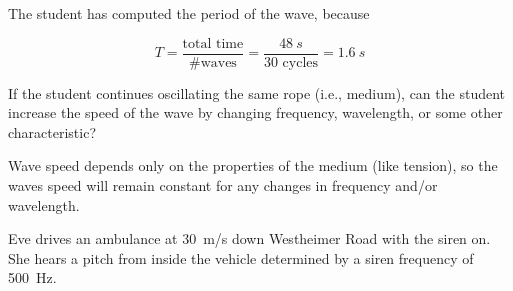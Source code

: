 \documentclass[]{exam}
\begin{document}
\begin{questions}
\begin{solutionorbox}
The student has computed the period of the wave, because 

\begin{equation*}
    T = \frac{\text{total time}}{\text{\# waves}} = \frac{\SI{48}{s}}{\text{30 cycles}} = \SI{1.6}{s}
\end{equation*}
\end{solutionorbox}

\fillwithlines{1.4cm}


\question \label{Q4}
If the student continues oscillating the same rope (i.e., medium), can the student increase the speed of the wave by changing frequency, wavelength, or some other characteristic?

\ifprintanswers
{\color{red}
Wave speed depends only on the properties of the medium (like tension), so the waves speed will remain constant for any changes in frequency and/or wavelength. 
}
\fi

\fillwithlines{1.4cm}


\question
Eve drives an ambulance at \SI{30}{m/s} down Westheimer Road with the siren on. She hears a pitch from inside the vehicle determined by a siren frequency of \SI{500}{Hz}. 

\begin{center}
\end{center}

\end{questions}
\end{document}
